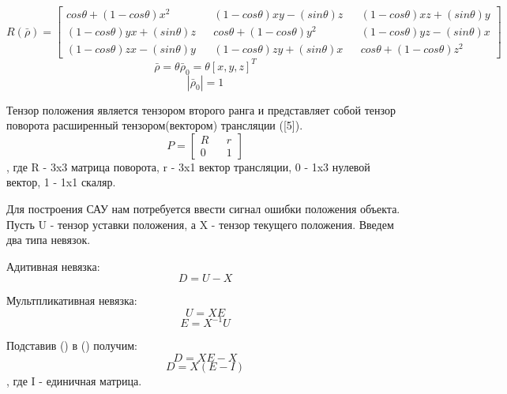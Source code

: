 \documentclass[a4paper]{article}
\begin{document}
\begin{equation}
R(\bar{\rho}) = 
\begin{bmatrix}
cos\theta+(1-cos\theta)x^2   && (1-cos\theta)xy-(sin\theta)z && (1-cos\theta)xz + (sin\theta)y\\
(1-cos\theta)yx+(sin\theta)z && cos\theta+(1-cos\theta)y^2   && (1-cos\theta)yz - (sin\theta)x\\
(1-cos\theta)zx-(sin\theta)y && (1-cos\theta)zy+(sin\theta)x && cos\theta+(1-cos\theta)z^2
\end{bmatrix}
\end{equation}
\begin{equation} \bar{\rho} = \theta \bar{\rho}_0 = \theta [x,y,z]^T 	\end{equation}
\begin{equation} |\bar{\rho}_0| = 1 									\end{equation}

Тензор положения является тензором второго ранга и представляет собой тензор поворота расширенный тензором(вектором) трансляции ([5]).
\begin{equation}
P = \begin{bmatrix}R&&r\\0&&1\end{bmatrix}
\end{equation}
, где R - 3x3 матрица поворота, r - 3x1 вектор трансляции, 0 - 1x3 нулевой вектор, 1 - 1x1 скаляр.  

Для построения САУ нам потребуется ввести сигнал ошибки положения объекта. 
Пусть U - тензор уставки положения, а X - тензор текущего положения.
Введем два типа невязок.

Адитивная невязка:
\begin{equation}
D = U - X
\end{equation}

Мультпликативная невязка:
\begin{equation} U = XE 		\end{equation}
\begin{equation} E = X^{-1}U 	\end{equation}

Подставив () в () получим:
\begin{equation} D = XE - X 	\end{equation}
\begin{equation} D = X(E - I)	\end{equation}
, где I - единичная матрица.
\end{document}
